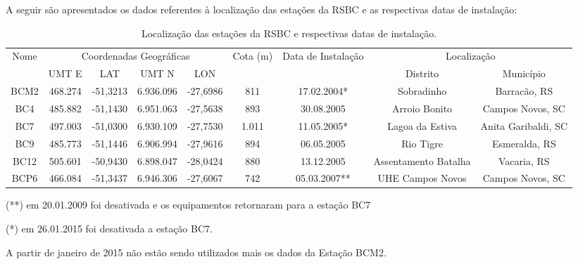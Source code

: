 A seguir são apresentados os dados referentes à localização das estações da RSBC e as respectivas datas de instalação:

\begin{table}[htb!]
\centering
\tiny
    \captionsetup{justification=justified}
    \caption{Localização das estações da RSBC e respectivas datas de instalação.}
    \begin{tabular}{|c|c|c|c|c|c|c|c|c|}
        \hline
        \multirow{2}{*}{Nome}
            & \multicolumn{4}{c|}{Coordenadas Geográficas}
            & \multirow{2}{*}{Cota (m)} & \multirow{2}{*}{Data de Instalação} 
            & \multicolumn{2}{c|}{Localização} \\
            \cline{2-5}
            \cline{8-9}
            & UMT E &  LAT & UMT N &LON &&& Distrito & Município \\
        \hline
        BCM2 & 468.274 & -51,3213 & 6.936.096 & -27,6986 & 811 & 17.02.2004* & Sobradinho & Barracão, RS\\
        \hline
        BC4 & 485.882 & -51,1430 & 6.951.063 & -27,5638 & 893 & 30.08.2005 & Arroio Bonito & Campos Novos, SC \\
        \hline
        BC7 & 497.003 & -51,0300 & 6.930.109 & -27,7530 & 1.011 & 11.05.2005* & Lagoa da Estiva & Anita Garibaldi, SC \\
        \hline
        BC9 & 485.773 & -51,1446 & 6.906.994 & -27,9616 & 894 & 06.05.2005 & Rio Tigre & Esmeralda, RS \\
        \hline
        BC12 & 505.601 & -50,9430 & 6.898.047 & -28,0424 & 880 & 13.12.2005 & Assentamento Batalha & Vacaria, RS \\
        \hline
        BCP6 & 466.084 & -51,3437 & 6.946.306 & -27,6067 & 742 & 05.03.2007** & UHE Campos Novos & Campos Novos, SC \\
        \hline
    \end{tabular}
\end{table}
\caption*{(**) em 20.01.2009 foi desativada e os equipamentos retornaram para a estação BC7}
\caption*{(*) em 26.01.2015 foi desativada a estação BC7.}
\caption*{A partir de janeiro de 2015 não estão sendo utilizados mais os dados da Estação BCM2.}


